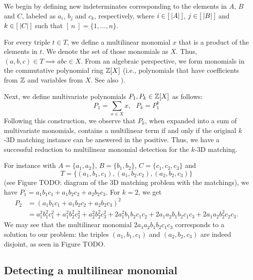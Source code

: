We begin by defining new indeterminates corresponding to the elements in $A$, $B$ and $C$, 
labeled as $a_i$, $b_j$ and $c_k$, respectively, where $i\in [\:{\left\vert A\right\vert}\:]$, $j\in
[\:{\left\vert B\right\vert}\:]$ and $k\in [\:{\left\vert C\right\vert}\:]$ such that $[\:n\:] = \{1,\ldots,n\}$. 

For every triple $t \in T$, we define a multilinear monomial $x$ that is a
product of the elements in $t$. 
We denote the set of those monomials as $X$. 
Thus, $(a,b,c) \in T \implies abc \in X$.
From an algebraic perspective, we form monomials in the commutative polynomial 
ring $\mathbb Z[X]$ (i.e., polynomials that have coefficients from $\mathbb Z$ and variables from $X$. 
See also ). 

Next, we define multivariate polynomials
{$P_1, P_k \in \mathbb Z[X]$}
as follows: 
\[
  P_1 = \displaystyle \sum_{x \in X}x, \: \: \: P_k = P_1^k
\]
Following this construction, we observe that $P_k$, 
when expanded into a sum of multivariate monomials, 
contains a multilinear term if and only if the original 
$k$-3D matching instance can be answered in the positive. 
Thus, we have a successful reduction to 
multilinear monomial detection for the $k$-3D matching. 

For instance with $A = \{a_1, a_2\}$, $B = \{b_1, b_2\}$, $C = \{c_1, c_2,
c_3\}$ and 
\[
  T = \{(a_1, b_1, c_1), (a_1, b_2. c_2), (a_2, b_2, c_3)\}
\]
(see Figure TODO: diagram of the 3D matching problem with the matchings), 
we have $P_1 = a_1b_1c_1 + a_1b_2c_2 + a_2b_2c_3$. For $k=2$, we get 
\begin{align*}
  P_2 &= (a_1b_1c_1 + a_1b_2c_2 + a_2b_2c_3)^2 \\
  &= a_1^2b_1^2c_1^2 + a_1^2b_2^2c_2^2 + a_2^2b_2^2c_3^2 + 
  2a_1^2b_1b_2c_1c_2 + 2a_1a_2b_1b_2c_1c_3 + 2 a_1a_2b_2^2c_2c_3.
\end{align*}
We may see that the multilinear monomial $2a_1a_2b_1b_2c_1c_3$ corresponds 
to a solution to our problem: the triples $(a_1,b_1,c_1)$ and $(a_2,b_2,c_3)$ are 
indeed disjoint, as seen in Figure TODO.

\subsection{Detecting a multilinear monomial}
\label{sect:problem_definition}

